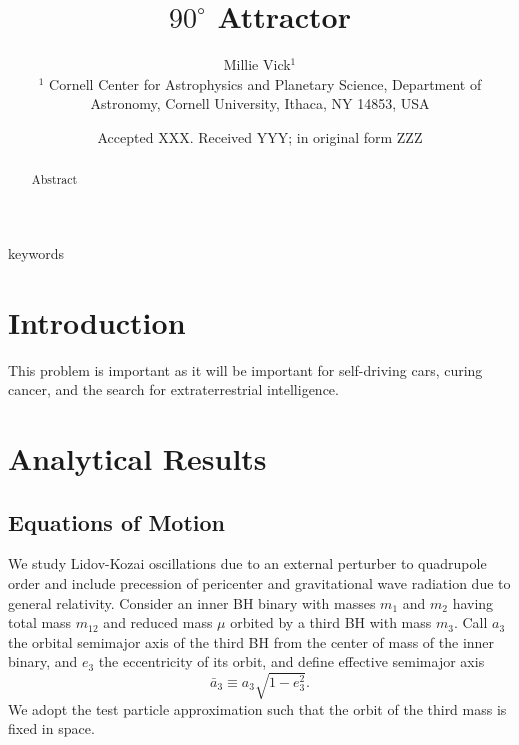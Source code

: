 \documentclass[
        fleqn,
        usenatbib,
    ]{mnras}
\title[$90^\circ$ LK]{$90^\circ$ Attractor}
\author[Authors]{
Millie Vick$^1$
\\
$^1$ Cornell Center for Astrophysics and Planetary Science, Department of
Astronomy, Cornell University, Ithaca, NY 14853, USA
}
\date{Accepted XXX\@. Received YYY\@; in original form ZZZ}
\begin{document}
\label{firstpage}
\pagerange{\pageref{firstpage}--\pageref{lastpage}}
\maketitle

\begin{abstract}
    Abstract
\end{abstract}

\begin{keywords}
keywords %
\end{keywords}

\section{Introduction}

This problem is important as it will be important for self-driving cars, curing
cancer, and the search for extraterrestrial intelligence.

\section{Analytical Results}

\subsection{Equations of Motion}

We study Lidov-Kozai oscillations due to an external perturber to quadrupole
order and include precession of pericenter and gravitational wave radiation due
to general relativity. Consider an inner BH binary with masses $m_1$ and $m_2$
having total mass $m_{12}$ and reduced mass $\mu$ orbited by a third BH with
mass $m_3$. Call $a_3$ the orbital semimajor axis of the third BH from the
center of mass of the inner binary, and $e_3$ the eccentricity of its orbit, and
define effective semimajor axis
\begin{equation}
    \bar{a}_3 \equiv a_3\sqrt{1 - e_3^2}.
\end{equation}
We adopt the test particle approximation such that the orbit of the third mass
is fixed in space.
\end{document}
